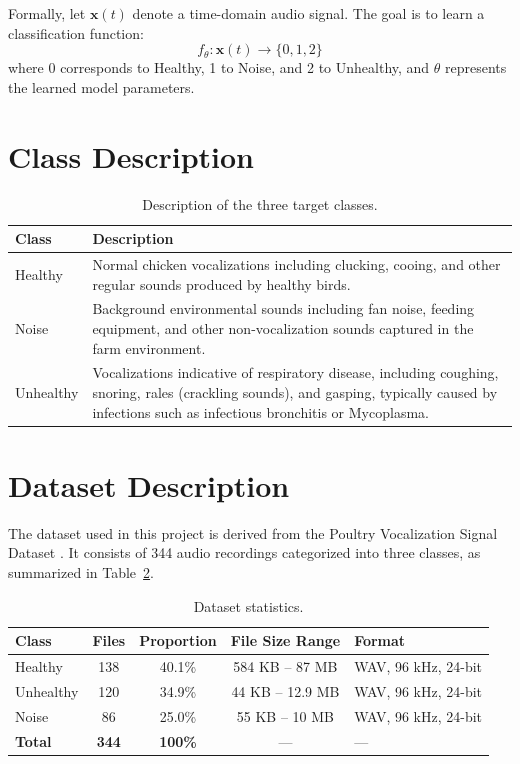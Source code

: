\documentclass[12pt,a4paper]{report}
\begin{document}
Formally, let $\mathbf{x}(t)$ denote a time-domain audio signal. The goal is to learn a classification function:
\begin{equation}
    f_\theta: \mathbf{x}(t) \to \{0, 1, 2\}
\end{equation}
where 0 corresponds to Healthy, 1 to Noise, and 2 to Unhealthy, and $\theta$ represents the learned model parameters.

\section{Class Description}

\begin{table}[H]
\centering
\caption{Description of the three target classes.}
\label{tab:class_description}
\begin{tabular}{lp{10cm}}
\toprule
\textbf{Class} & \textbf{Description} \\
\midrule
Healthy & Normal chicken vocalizations including clucking, cooing, and other regular sounds produced by healthy birds. \\
\addlinespace
Noise & Background environmental sounds including fan noise, feeding equipment, and other non-vocalization sounds captured in the farm environment. \\
\addlinespace
Unhealthy & Vocalizations indicative of respiratory disease, including coughing, snoring, rales (crackling sounds), and gasping, typically caused by infections such as infectious bronchitis or Mycoplasma. \\
\bottomrule
\end{tabular}
\end{table}

\section{Dataset Description}
\label{sec:dataset}

The dataset used in this project is derived from the Poultry Vocalization Signal Dataset \cite{datainbrief2023}. It consists of 344 audio recordings categorized into three classes, as summarized in Table~\ref{tab:dataset_stats}.

\begin{table}[H]
\centering
\caption{Dataset statistics.}
\label{tab:dataset_stats}
\begin{tabular}{lcccl}
\toprule
\textbf{Class} & \textbf{Files} & \textbf{Proportion} & \textbf{File Size Range} & \textbf{Format} \\
\midrule
Healthy   & 138 & 40.1\% & 584 KB -- 87 MB & WAV, 96 kHz, 24-bit \\
Unhealthy & 120 & 34.9\% & 44 KB -- 12.9 MB & WAV, 96 kHz, 24-bit \\
Noise     & 86  & 25.0\% & 55 KB -- 10 MB & WAV, 96 kHz, 24-bit \\
\midrule
\textbf{Total} & \textbf{344} & \textbf{100\%} & --- & --- \\
\bottomrule
\end{tabular}
\end{table}
\end{document}
